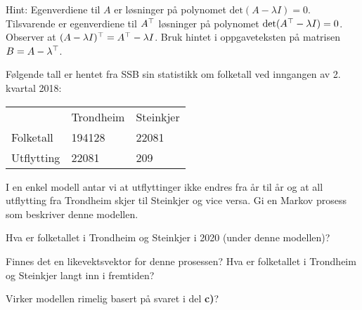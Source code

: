 \begin{losning}
Hint: Egenverdiene til $A$ er løsninger på polynomet $\text{det}(A-\lambda I)=0$. Tilsvarende er egenverdiene til $A^\top$ løsninger på polynomet $\text{det}(A^\top-\lambda I)=0$. Observer at $(A-\lambda I)^\top=A^\top-\lambda I$. Bruk hintet i oppgaveteksten på matrisen $B=A-\lambda^\top$.
\end{losning}


\begin{oppgave}
Følgende tall er hentet fra SSB sin statistikk om folketall ved inngangen av 2. kvartal 2018:

\begin{table}[h]
\begin{tabular}{lll}
           & Trondheim & Steinkjer \\
Folketall & 194128    & 22081     \\
Utflytting & 22081     & 209      
\end{tabular}
\end{table}

\begin{punkt}
I en enkel modell antar vi at utflyttinger ikke endres fra år til år og at all utflytting fra Trondheim skjer til Steinkjer og vice versa. Gi en Markov prosess som beskriver denne modellen.
\end{punkt}

\begin{punkt}
Hva er folketallet i Trondheim og Steinkjer i 2020 (under denne modellen)?
\end{punkt}

\begin{punkt}
Finnes det en likevektsvektor for denne prosessen? Hva er folketallet i Trondheim og Steinkjer langt inn i fremtiden?
\end{punkt}

\begin{punkt}
Virker modellen rimelig basert på svaret i del \textbf{c)}?
\end{punkt}

\end{oppgave}

